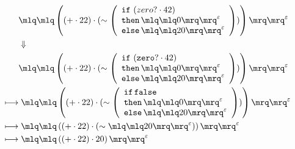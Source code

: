 \documentclass{article}
\begin{document}
\tiny\begin{align*}
&\quot{\left(\left(+\cdot 22\right)\cdot (\sim \left(\begin{array}{l}\mathtt{if}\,\left(zero?\cdot 42\right)\\\mathtt{then}\,\quot{0}^{\varepsilon}\\\mathtt{else}\,\quot{20}^{\varepsilon}\end{array}\right))\right)}^{\varepsilon}\\ 
&\Downarrow\\ 
&\quot{\left(\left(+\cdot 22\right)\cdot (\sim \left(\begin{array}{l}\mathtt{if}\,\left(\mathtt{zero?}\cdot 42\right)\\\mathtt{then}\,\quot{0}^{\varepsilon}\\\mathtt{else}\,\quot{20}^{\varepsilon}\end{array}\right))\right)}^{\varepsilon}\\ 
\longmapsto &\;\quot{\left(\left(+\cdot 22\right)\cdot (\sim \left(\begin{array}{l}\mathtt{if}\,\mathtt{false}\\\mathtt{then}\,\quot{0}^{\varepsilon}\\\mathtt{else}\,\quot{20}^{\varepsilon}\end{array}\right))\right)}^{\varepsilon}\\ 
\longmapsto &\;\quot{\left(\left(+\cdot 22\right)\cdot (\sim \quot{20}^{\varepsilon})\right)}^{\varepsilon}\\ 
\longmapsto &\;\quot{\left(\left(+\cdot 22\right)\cdot 20\right)}^{\varepsilon}\\ 
\end{align*}
\end{document}
